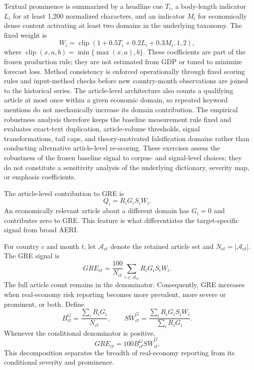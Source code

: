 \documentclass[preprint,12pt,authoryear]{elsarticle}
\begin{document}
Textual prominence is summarized by a headline cue $T_i$, a body-length indicator $L_i$ for at least 1,200 normalized characters, and an indicator $M_i$ for economically dense content activating at least two domains in the underlying taxonomy. The fixed weight is
\begin{equation}
W_i=\operatorname{clip}(1+0.5T_i+0.2L_i+0.3M_i,1,2),
\label{eq:weight}
\end{equation}
where $\operatorname{clip}(x,a,b)=\min\{\max(x,a),b\}$. These coefficients are part of the frozen production rule; they are not estimated from GDP or tuned to minimize forecast loss. Method consistency is enforced operationally through fixed scoring rules and input-method checks before new country-month observations are joined to the historical series. The article-level architecture also counts a qualifying article at most once within a given economic domain, so repeated keyword mentions do not mechanically increase its domain contribution. The empirical robustness analysis therefore keeps the baseline measurement rule fixed and evaluates exact-text duplication, article-volume thresholds, signal transformations, tail caps, and theory-motivated falsification domains rather than conducting alternative article-level re-scoring. These exercises assess the robustness of the frozen baseline signal to corpus- and signal-level choices; they do not constitute a sensitivity analysis of the underlying dictionary, severity map, or emphasis coefficients.

The article-level contribution to GRE is
\begin{equation}
Q_i=R_iG_iS_iW_i.
\label{eq:article}
\end{equation}
An economically relevant article about a different domain has $G_i=0$ and contributes zero to GRE. This feature is what differentiates the target-specific signal from broad AERI.




For country $c$ and month $t$, let $\mathcal A_{ct}$ denote the retained article set and $N_{ct}=|\mathcal A_{ct}|$. The GRE signal is
\begin{equation}
GRE_{ct}=\frac{100}{N_{ct}}\sum_{i\in\mathcal A_{ct}}R_iG_iS_iW_i.
\label{eq:gre}
\end{equation}
The full article count remains in the denominator. Consequently, GRE increases when real-economy risk reporting becomes more prevalent, more severe or prominent, or both. Define
\begin{equation}
B^G_{ct}=\frac{\sum_iR_iG_i}{N_{ct}}, \qquad
\overline{SW}^{G}_{ct}=\frac{\sum_iR_iG_iS_iW_i}{\sum_iR_iG_i}.
\end{equation}
Whenever the conditional denominator is positive,
\begin{equation}
GRE_{ct}=100B^G_{ct}\overline{SW}^{G}_{ct}.
\label{eq:decomp}
\end{equation}
This decomposition separates the breadth of real-economy reporting from its conditional severity and prominence.
\end{document}
